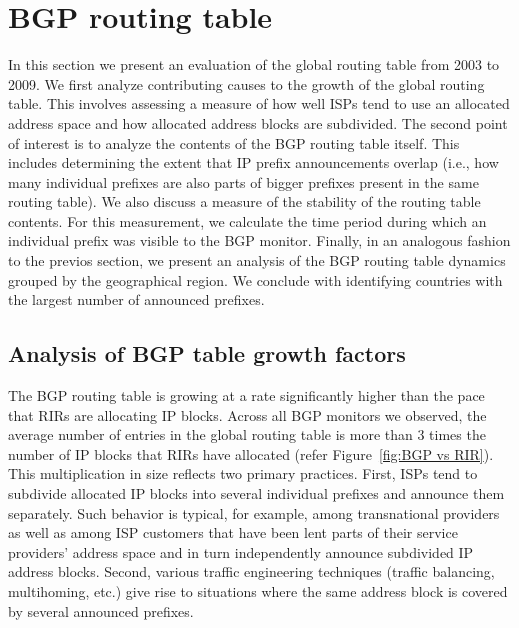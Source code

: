 \section{BGP routing table}
\label{sec:bgp}

In this section we present an evaluation of the global routing table from 2003
to 2009. We first analyze contributing causes to the growth of the global
routing table. This involves assessing a measure of how well ISPs tend to use
an allocated address space and how allocated address blocks are subdivided.
The second point of interest is to analyze the contents of the BGP routing
table itself. This includes determining the extent that IP prefix
announcements overlap (i.e., how many individual prefixes are also parts of
bigger prefixes present in the same routing table). We also discuss a measure
of the stability of the routing table contents. For this measurement, we
calculate the time period during which an individual prefix was visible to the
BGP monitor. Finally, in an analogous fashion to the previos section, we
present an analysis of the BGP routing table dynamics grouped by the
geographical region. We conclude with identifying countries with the largest
number of announced prefixes.

\subsection{Analysis of BGP table growth factors}

The BGP routing table is growing at a rate significantly higher than the pace
that RIRs are allocating IP blocks. Across all BGP monitors we observed, the
average number of entries in the global routing table is more than 3 times the
number of IP blocks that RIRs have allocated (refer Figure~\ref{fig:BGP vs
RIR}). This multiplication in size reflects two primary practices. First, ISPs
tend to subdivide allocated IP blocks into several individual prefixes and
announce them separately. Such behavior is typical, for example, among
transnational providers as well as among ISP customers that have been lent
parts of their service providers' address space and in turn independently
announce subdivided IP address blocks. Second, various traffic engineering
techniques (traffic balancing, multihoming, etc.) give rise to situations where
the same address block is covered by several announced prefixes.

